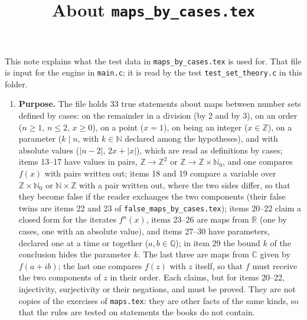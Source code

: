 \documentclass[11pt,a4paper]{article}
\title{About \texttt{maps\_by\_cases.tex}}
\author{}
\date{}
\begin{document}
\maketitle
This note explains what the test data in \texttt{maps\_by\_cases.tex} is used for. That file is input for the engine in \texttt{main.c}; it is read by the test \texttt{test\_set\_theory.c} in this folder.

\begin{enumerate}
\item \textbf{Purpose.} The file holds 33 true statements about maps between number sets defined by cases: on the remainder in a division (by 2 and by 3), on an order ($n \ge 1$, $n \le 2$, $x \ge 0$), on a point ($x = 1$), on being an integer ($x \in \mathbb{Z}$), on a parameter ($k \mid n$, with $k \in \mathbb{N}$ declared among the hypotheses), and with absolute values ($|n - 2|$, $2x + |x|$), which are read as definitions by cases; items 13--17 have values in pairs, $\mathbb{Z} \to \mathbb{Z}^{2}$ or $\mathbb{Z} \to \mathbb{Z} \times \mathbb{N}_{0}$, and one compares $f(x)$ with pairs written out; items 18 and 19 compare a variable over $\mathbb{Z} \times \mathbb{N}_{0}$ or $\mathbb{N} \times \mathbb{Z}$ with a pair written out, where the two sides differ, so that they become false if the reader exchanges the two components (their false twins are items 22 and 23 of \texttt{false\_maps\_by\_cases.tex}); items 20--22 claim a closed form for the iterates $f^{n}(x)$, items 23--26 are maps from $\mathbb{R}$ (one by cases, one with an absolute value), and items 27--30 have parameters, declared one at a time or together ($a, b \in \mathbb{Q}$); in item 29 the bound $k$ of the conclusion hides the parameter $k$. The last three are maps from $\mathbb{C}$ given by $f(a + ib)$; the last one compares $f(z)$ with $z$ itself, so that $f$ must receive the two components of $z$ in their order. Each claims, but for items 20--22, injectivity, surjectivity or their negations, and must be proved. They are not copies of the exercises of \texttt{maps.tex}: they are other facts of the same kinds, so that the rules are tested on statements the books do not contain.


\end{enumerate}
\end{document}
